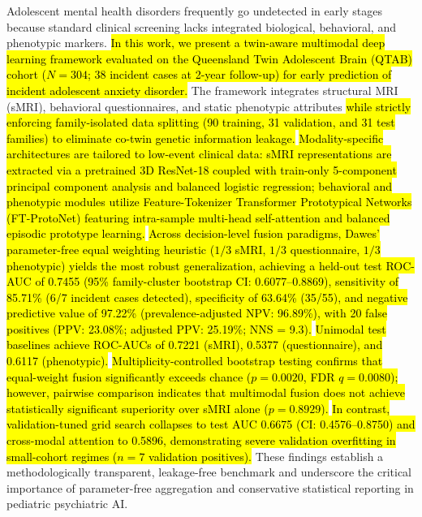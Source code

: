 \documentclass[10pt,letterpaper]{article}
\begin{document}
Adolescent mental health disorders frequently go undetected in early stages because standard clinical screening lacks integrated biological, behavioral, and phenotypic markers. \hl{In this work, we present a twin-aware multimodal deep learning framework evaluated on the Queensland Twin Adolescent Brain (QTAB) cohort ($N=304$; 38 incident cases at 2-year follow-up) for early prediction of incident adolescent anxiety disorder.} The framework integrates structural MRI (sMRI), behavioral questionnaires, and static phenotypic attributes \hl{while strictly enforcing family-isolated data splitting (90 training, 31 validation, and 31 test families) to eliminate co-twin genetic information leakage.} \hl{Modality-specific architectures are tailored to low-event clinical data: sMRI representations are extracted via a pretrained 3D ResNet-18 coupled with train-only 5-component principal component analysis and balanced logistic regression; behavioral and phenotypic modules utilize Feature-Tokenizer Transformer Prototypical Networks (FT-ProtoNet) featuring intra-sample multi-head self-attention and balanced episodic prototype learning.} \hl{Across decision-level fusion paradigms, Dawes' parameter-free equal weighting heuristic ($1/3$ sMRI, $1/3$ questionnaire, $1/3$ phenotypic) yields the most robust generalization, achieving a held-out test ROC-AUC of 0.7455 (95\% family-cluster bootstrap CI: 0.6077--0.8869), sensitivity of 85.71\% (6/7 incident cases detected), specificity of 63.64\% (35/55), and negative predictive value of 97.22\% (prevalence-adjusted NPV: 96.89\%), with 20 false positives (PPV: 23.08\%; adjusted PPV: 25.19\%; NNS = 9.3).} \hl{Unimodal test baselines achieve ROC-AUCs of 0.7221 (sMRI), 0.5377 (questionnaire), and 0.6117 (phenotypic).} \hl{Multiplicity-controlled bootstrap testing confirms that equal-weight fusion significantly exceeds chance ($p = 0.0020$, FDR $q = 0.0080$); however, pairwise comparison indicates that multimodal fusion does not achieve statistically significant superiority over sMRI alone ($p = 0.8929$).} \hl{In contrast, validation-tuned grid search collapses to test AUC 0.6675 (CI: 0.4576--0.8750) and cross-modal attention to 0.5896, demonstrating severe validation overfitting in small-cohort regimes ($n=7$ validation positives).} These findings establish a methodologically transparent, leakage-free benchmark and underscore the critical importance of parameter-free aggregation and conservative statistical reporting in pediatric psychiatric AI.

\end{document}
